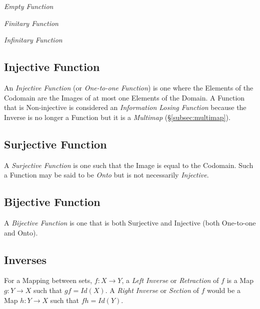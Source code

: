\documentclass{article}
\begin{document}
\emph{Empty Function}

\emph{Finitary Function}

\emph{Infinitary Function}

\subsection{Injective Function}\label{subsec:injective_function}

An \emph{Injective Function} (or \emph{One-to-one Function}) is one
where the Elements of the Codomain are the Images of at most one
Elements of the Domain. A Function that is Non-injective is considered
an \emph{Information Losing Function} because the Inverse is no longer
a Function but it is a \emph{Multimap} (\S\ref{subsec:multimap}).

\subsection{Surjective Function}\label{subsec:surjective_function}

A \emph{Surjective Function} is one such that the Image is equal to
the Codomain. Such a Function may be said to be \emph{Onto} but is not
necessarily \emph{Injective}.

\subsection{Bijective Function}\label{subsec:bijective_function}

A \emph{Bijective Function} is one that is both Surjective and
Injective (both One-to-one and Onto).

\subsection{Inverses}\label{subsec:inverse_functions}

For a Mapping between sets, $f: X \rightarrow Y$, a \emph{Left
  Inverse} or \emph{Retraction} of $f$ is a Map $g: Y \rightarrow X$
such that $gf = Id(X)$. A \emph{Right Inverse} or \emph{Section} of
$f$ would be a Map $h: Y \rightarrow X$ such that $fh = Id(Y)$.
\end{document}
